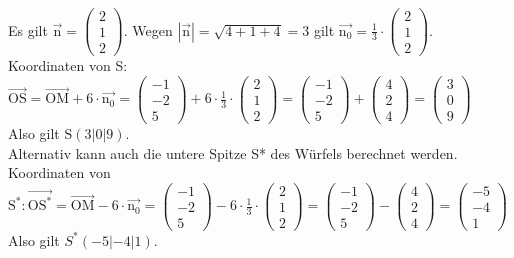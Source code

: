 \documentclass[10pt]{article}
\begin{document}
Es gilt $\overrightarrow{\mathrm{n}}=\left(\begin{array}{l}2 \\ 1 \\ 2\end{array}\right)$. Wegen $|\overrightarrow{\mathrm{n}}|=\sqrt{4+1+4}=3$ gilt $\overrightarrow{\mathrm{n}_{0}}=\frac{1}{3} \cdot\left(\begin{array}{l}2 \\ 1 \\ 2\end{array}\right)$.\\
Koordinaten von S: $\overrightarrow{\mathrm{OS}}=\overrightarrow{\mathrm{OM}}+6 \cdot \overrightarrow{\mathrm{n}_{0}}=\left(\begin{array}{c}-1 \\ -2 \\ 5\end{array}\right)+6 \cdot \frac{1}{3} \cdot\left(\begin{array}{l}2 \\ 1 \\ 2\end{array}\right)=\left(\begin{array}{c}-1 \\ -2 \\ 5\end{array}\right)+\left(\begin{array}{l}4 \\ 2 \\ 4\end{array}\right)=\left(\begin{array}{l}3 \\ 0 \\ 9\end{array}\right)$\\
Also gilt $\mathrm{S}(3|0| 9)$.\\
Alternativ kann auch die untere Spitze S* des Würfels berechnet werden.\\
Koordinaten von $\mathrm{S}^{*}: \overrightarrow{\mathrm{OS}^{*}}=\overrightarrow{\mathrm{OM}}-6 \cdot \overrightarrow{\mathrm{n}_{0}}=\left(\begin{array}{c}-1 \\ -2 \\ 5\end{array}\right)-6 \cdot \frac{1}{3} \cdot\left(\begin{array}{l}2 \\ 1 \\ 2\end{array}\right)=\left(\begin{array}{c}-1 \\ -2 \\ 5\end{array}\right)-\left(\begin{array}{l}4 \\ 2 \\ 4\end{array}\right)=\left(\begin{array}{c}-5 \\ -4 \\ 1\end{array}\right)$ Also gilt $S^{*}(-5|-4| 1)$.
\end{document}
